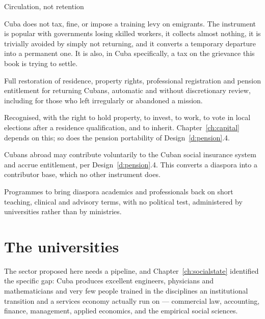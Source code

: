\begin{design}{Circulation, not retention}
\label{d:diaspora}
\begin{rules}
 Cuba does not tax, fine, or impose a training levy on
emigrants. The instrument is popular with governments losing skilled workers, it
collects almost nothing, it is trivially avoided by simply not returning, and it
converts a temporary departure into a permanent one. It is also, in Cuba
specifically, a tax on the grievance this book is trying to settle.

 Full restoration of residence, property rights,
professional registration and pension entitlement for returning Cubans,
automatic and without discretionary review, including for those who left
irregularly or abandoned a mission.

 Recognised, with the right to hold property, to invest,
to work, to vote in local elections after a residence qualification, and to
inherit. Chapter~\ref{ch:capital} depends on this; so does the pension
portability of Design~\ref{d:pension}.4.

 Cubans abroad may contribute voluntarily to the
Cuban social insurance system and accrue entitlement, per
Design~\ref{d:pension}.4. This converts a diaspora into a contributor base,
which no other instrument does.

 Programmes to bring diaspora academics and
professionals back on short teaching, clinical and advisory terms, with no
political test, administered by universities rather than by ministries.
\end{rules}
\end{design}

\section{The universities}

The sector proposed here needs a pipeline, and Chapter~\ref{ch:socialstate}
identified the specific gap: Cuba produces excellent engineers, physicians and
mathematicians and very few people trained in the disciplines an institutional
transition and a services economy actually run on --- commercial law, accounting,
finance, management, applied economics, and the empirical social sciences.

